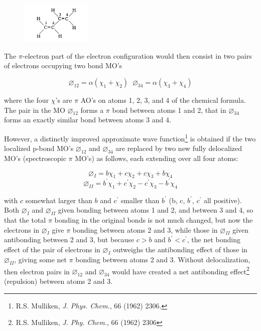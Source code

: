 \documentclass[11pt]{memoir}
\begin{document}
\begin{figure}
	\vspace{-20pt}
	\begin{center}
	\includegraphics[width=0.3\textwidth]{images/mulliken_figure9a.png}
    \end{center}
    \vspace{-10pt}
\end{figure}

The $\pi$-electron part of the electron configuration would then consist in two pairs of electrons occupying two bond MO's 

\begin{equation*}
\varnothing _{12} = \alpha (\chi_1 + \chi_2) \;\; \varnothing _{34} = \alpha (\chi_3 + \chi_4)
\end{equation*}

\noindent where the four $\chi$'s are $\pi$ AO's on atoms 1, 2, 3, and 4 of the chemical formula.  The pair in the MO $\varnothing _{12}$ forms a $\pi$ bond between atoms 1 and 2, that in $\varnothing _{34}$ forms an exactly similar bond between atoms 3 and 4.


However, a distinctly improved approximate wave function\footnote{R.S. Mulliken, \emph{J. Phys. Chem.}, 66 (1962) 2306.} is obtained if the two localized p-bond MO's $\varnothing _{12}$ and $\varnothing _{34}$ are replaced by two new fully delocalized MO's (spectroscopic $\pi$ MO's) as follows, each extending over all four atoms:

\[\varnothing_I = b\chi_1 + c\chi_2 + c\chi_3 + b\chi_4 \]
\[\varnothing_{II} = b ^\prime \chi_1 + c ^\prime \chi_2 - c ^\prime \chi_3 - b ^\prime \chi_4 \]


\noindent with $c$ somewhat larger than $b$ and $c^\prime$ smaller than $b^\prime$ (b, c, $b^\prime$, $c^\prime$ all positive).  Both $\varnothing_I$ and $\varnothing_{II}$ given bonding between atoms 1 and 2, and between 3 and 4, so that the total $\pi$ bonding in the original bonds is not much changed, but now the electrons in $\varnothing_I$ give $\pi$ bonding between atoms 2 and 3, while those in $\varnothing_{II}$ given antibonding between 2 and 3, but because $c>b$ and $b^\prime < c^\prime$, the net bonding effect of the pair of electrons in $\varnothing_I$ outweighs the antibonding effect of those in $\varnothing_{II}$, giving some net $\pi$ bonding between atoms 2 and 3.  Without delocalization, then electron pairs in $\varnothing_{12}$ and $\varnothing_{34}$ would have created a net antibonding effect\footnote{R.S. Mulliken, \emph{J. Phy. Chem.}, 66 (1962) 2306} (repulsion) between atoms 2 and 3. 
\end{document}
